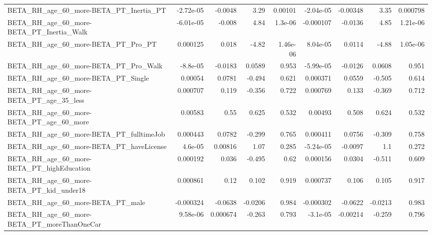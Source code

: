 \begin{tabular}{lrrrrrrrr}
BETA\_RH\_age\_60\_more-BETA\_PT\_Inertia\_PT             &   -2.72e-05 &      -0.0048 &     3.29 &  0.00101 &  -2.04e-05 &    -0.00348 &         3.35 &      0.000798 \\
BETA\_RH\_age\_60\_more-BETA\_PT\_Inertia\_Walk           &   -6.01e-05 &       -0.008 &     4.84 &  1.3e-06 &  -0.000107 &     -0.0136 &         4.85 &      1.21e-06 \\
BETA\_RH\_age\_60\_more-BETA\_PT\_Pro\_PT                 &    0.000125 &        0.018 &    -4.82 & 1.46e-06 &   8.04e-05 &      0.0114 &        -4.88 &      1.05e-06 \\
BETA\_RH\_age\_60\_more-BETA\_PT\_Pro\_Walk               &    -8.8e-05 &      -0.0183 &   0.0589 &    0.953 &  -5.99e-05 &     -0.0126 &       0.0608 &         0.951 \\
BETA\_RH\_age\_60\_more-BETA\_PT\_Single                 &     0.00054 &       0.0781 &   -0.494 &    0.621 &   0.000371 &      0.0559 &       -0.505 &         0.614 \\
BETA\_RH\_age\_60\_more-BETA\_PT\_age\_35\_less            &    0.000707 &        0.119 &   -0.356 &    0.722 &   0.000769 &       0.133 &       -0.369 &         0.712 \\
BETA\_RH\_age\_60\_more-BETA\_PT\_age\_60\_more            &     0.00583 &         0.55 &    0.625 &    0.532 &    0.00493 &       0.508 &        0.624 &         0.532 \\
BETA\_RH\_age\_60\_more-BETA\_PT\_fulltimeJob            &    0.000443 &       0.0782 &   -0.299 &    0.765 &   0.000411 &      0.0756 &       -0.309 &         0.758 \\
BETA\_RH\_age\_60\_more-BETA\_PT\_haveLicense            &     4.6e-05 &      0.00816 &     1.07 &    0.285 &  -5.24e-05 &     -0.0097 &          1.1 &         0.272 \\
BETA\_RH\_age\_60\_more-BETA\_PT\_highEducation          &    0.000192 &        0.036 &   -0.495 &     0.62 &   0.000156 &      0.0304 &       -0.511 &         0.609 \\
BETA\_RH\_age\_60\_more-BETA\_PT\_kid\_under18            &    0.000861 &         0.12 &    0.102 &    0.919 &   0.000737 &       0.106 &        0.105 &         0.917 \\
BETA\_RH\_age\_60\_more-BETA\_PT\_male                   &   -0.000324 &      -0.0638 &  -0.0206 &    0.984 &  -0.000302 &     -0.0622 &      -0.0213 &         0.983 \\
BETA\_RH\_age\_60\_more-BETA\_PT\_moreThanOneCar         &    9.58e-06 &     0.000674 &   -0.263 &    0.793 &   -3.1e-05 &    -0.00214 &       -0.259 &         0.796 \\

\end{tabular}
